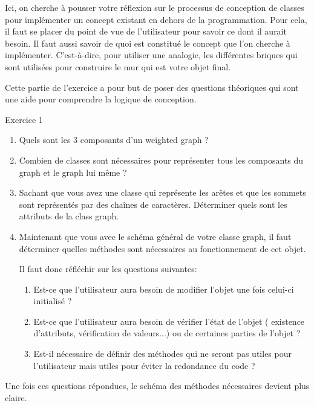 Ici, on cherche à pousser votre réflexion sur le processus de conception de classes pour implémenter un concept existant en dehors de la programmation.
Pour cela, il faut se placer du point de vue de l'utilisateur pour savoir ce dont il aurait besoin. 
Il faut aussi savoir de quoi est constitué le concept que l'on cherche à implémenter. C'est-à-dire, pour utiliser une analogie, les différentes briques qui sont utilisées pour construire le mur qui est votre objet final.

Cette partie de l'exercice a pour but de poser des questions théoriques qui sont une aide pour comprendre la logique de conception.

\begin{Exercice}[15 minutes] Exercice 1\\
    \begin{enumerate}
        \item Quels sont les 3 composants d'un weighted graph ?
        \item Combien de classes sont nécessaires pour représenter tous les composants du graph et le graph lui même ?
        \item Sachant que vous avez une classe qui représente les arêtes et que les sommets sont représentés par des chaînes de caractères. Déterminer quels sont les attributs de la class graph.
        \item Maintenant que vous avec le schéma général de votre classe graph, il faut déterminer quelles méthodes sont nécessaires au fonctionnement de cet objet.
        
        Il faut donc réfléchir sur les questions suivantes:
            \begin{enumerate}
            \item Est-ce que l'utilisateur aura besoin de modifier l'objet une fois celui-ci initialisé ?
            \item Est-ce que l'utilisateur aura besoin de vérifier l'état de l'objet ( existence d'attributs, vérification de valeurs...) ou de certaines parties de l'objet ?
            \item Est-il nécessaire de définir des méthodes qui ne seront pas utiles pour l'utilisateur mais utiles pour éviter la redondance du code ?
            \end{enumerate}
    \end{enumerate}
    Une fois ces questions répondues, le schéma des méthodes nécessaires devient plus claire.
    

\end{Exercice}

